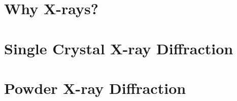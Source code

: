 \documentclass[11pt,a4paper]{article}
\begin{document}
	\section{Why X-rays?}
	
		
	
	
	
	
	
	
	
	
	
	
	\section{Single Crystal X-ray Diffraction}
	
		
		
		
	
		
		
		
		
		
		
		
	
	\section{Powder X-ray Diffraction}
	
		
		
	
	
	\medskip
	
	\printbibliography
		
\end{document}
